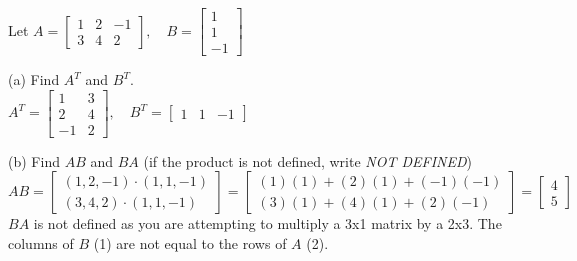 \documentclass{article}
\begin{document}
\begin{problem}
    Let $A=
    \begin{bmatrix}
        1 & 2 & -1\\
        3 & 4 & 2
    \end{bmatrix},
    \quad
    B= \begin{bmatrix}
        1\\
        1\\
        -1
    \end{bmatrix}$
    
    \begin{description}
    \item{(a)} Find $A^T$ and $B^T$.\\

        $A^T = \begin{bmatrix} 1 & 3 \\ 2 & 4 \\ -1 & 2 \end{bmatrix}, \quad
        B^T = \begin{bmatrix} 1 & 1 & -1 \end{bmatrix}$

    \item{(b)} Find $AB$ and $BA$ (if the product is not defined, write \textit{NOT DEFINED})\\

        $AB = \begin{bmatrix} (1, 2, -1) \cdot (1, 1, -1) \\ (3, 4, 2) \cdot (1, 1, -1) \end{bmatrix} = 
            \begin{bmatrix} (1)(1) + (2)(1) + (-1)(-1) \\ (3)(1) + (4)(1) + (2)(-1) \end{bmatrix} = 
            \begin{bmatrix} 4 \\ 5 \end{bmatrix}$\\

        $BA$ is not defined as you are attempting to multiply a 3x1 matrix by a 2x3. 
        The columns of $B$ (1) are not equal to the rows of $A$ (2).
    \end{description}

\end{problem}
\end{document}
